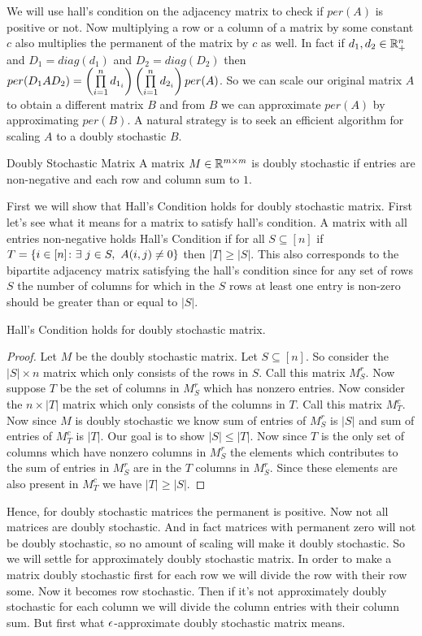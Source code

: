 We will use hall's condition on the adjacency matrix to check if $per(A)$ is positive or not. Now multiplying a row or a column of a matrix by some constant $c$ also multiplies the permanent of the matrix by $c$ as well. In fact if $d_1,d_2\in\mathbb{R}_+^n$ and $D_1=diag(d_1)$ and $D_2=diag(D_2)$  then $per(D_1AD_2)=\left(\prod\limits_{i=1}^nd_{1_i}\right)\left(\prod\limits_{i=1}^nd_{2_i}\right)per(A)$. So we can scale our original matrix $A$ to obtain a different matrix $B$ and from $B$ we can approximate $per(A)$ by approximating $per(B)$. A natural strategy is to seek an efficient algorithm for scaling $A$ to a doubly stochastic $B$.
\begin{Definition}{Doubly Stochastic Matrix}{}
	A matrix $M\in\mathbb{R}^{m\times m}$ is doubly stochastic if entries are non-negative and each row and column sum to $1$.
\end{Definition}

First we will show that Hall's Condition holds for doubly stochastic matrix. First let's see what it means for a matrix to satisfy hall's condition. A matrix with all entries non-negative holds Hall's Condition if for all $S\subseteq [n]$ if $T=\{i\in [n]\colon \exs\ j\in S,\ A(i,j)\neq 0\}$ then $|T|\geq |S|$. This also corresponds to the bipartite adjacency matrix satisfying the hall's condition since for any set of rows $S$ the number of columns for which in the $S$ rows at least one entry is non-zero should be greater than or equal to $|S|$.
\begin{lemma}{}{}
	Hall's Condition holds for doubly stochastic matrix.
\end{lemma}
\begin{proof}
	Let $M$ be the doubly stochastic matrix. Let $S\subseteq [n]$. So consider the $|S|\times n$ matrix which only consists of the rows in $S$. Call this matrix $M_S^r$. Now suppose $T$ be the set of columns in $M_S^r$ which has nonzero entries. Now consider the $n\times |T|$ matrix which only consists of the columns in $T$. Call this matrix $M_T^c$. Now since $M$ is doubly stochastic we know sum of entries of $M_S^r$ is $|S|$ and sum of entries of $M_T^c$ is $|T|$. Our goal is to show $|S|\leq |T|$. Now since $T$ is the only set of columns which have nonzero columns in $M_S^r$ the elements which contributes to the sum of entries in $M_S^r$ are in the  $T$ columns in $M_S^r$. Since these elements are also present in $M_T^c$ we have $|T|\geq |S|$.
\end{proof}

Hence, for doubly stochastic matrices the permanent is positive. Now not all matrices are doubly stochastic. And in fact matrices with permanent zero will not be doubly stochastic, so no amount of scaling will make it doubly stochastic. So we will settle for approximately doubly stochastic matrix. In order to make a matrix doubly stochastic first for each row we will divide the row with their row some. Now it becomes row stochastic. Then if it's not approximately doubly stochastic for each column we will divide the column entries with their column sum. But first what $\epsilon$-approximate doubly stochastic matrix means.

